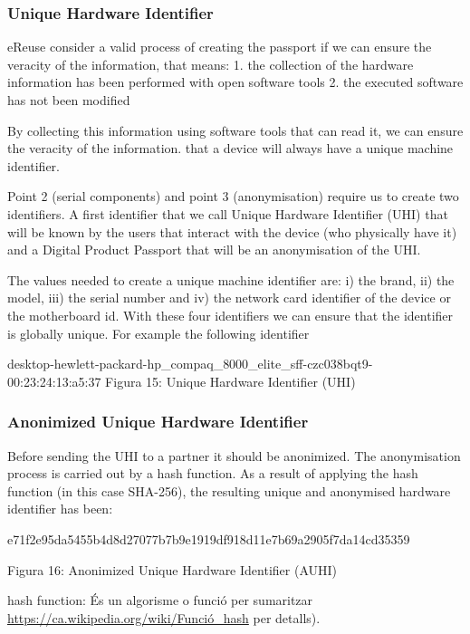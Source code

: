\documentclass[
]{book}
\begin{document}
\hypertarget{unique-hardware-identifier}{%
\subsubsection{Unique Hardware Identifier}\label{unique-hardware-identifier}}

eReuse consider a valid process of creating the passport if we can ensure the veracity of the information, that means: 1. the collection of the hardware information has been performed with open software tools 2. the executed software has not been modified

By collecting this information using software tools that can read it, we can ensure the veracity of the information. that a device will always have a unique machine identifier.

Point 2 (serial components) and point 3 (anonymisation) require us to create two identifiers. A first identifier that we call Unique Hardware Identifier (UHI) that will be known by the users that interact with the device (who physically have it) and a Digital Product Passport that will be an anonymisation of the UHI.

The values needed to create a unique machine identifier are: i) the brand, ii) the model, iii) the serial number and iv) the network card identifier of the device or the motherboard id. With these four identifiers we can ensure that the identifier is globally unique. For example the following identifier

desktop-hewlett-packard-hp\_compaq\_8000\_elite\_sff-czc038bqt9-00:23:24:13:a5:37 Figura 15: Unique Hardware Identifier (UHI)

\hypertarget{anonimized-unique-hardware-identifier}{%
\subsubsection{Anonimized Unique Hardware Identifier}\label{anonimized-unique-hardware-identifier}}

Before sending the UHI to a partner it should be anonimized. The anonymisation process is carried out by a hash function. As a result of applying the hash function (in this case SHA-256), the resulting unique and anonymised hardware identifier has been:

e71f2e95da5455b4d8d27077b7b9e1919df918d11e7b69a2905f7da14cd35359

Figura 16: Anonimized Unique Hardware Identifier (AUHI)

hash function: És un algorisme o funció per sumaritzar \url{https://ca.wikipedia.org/wiki/Funció_hash} per detalls).
\end{document}
